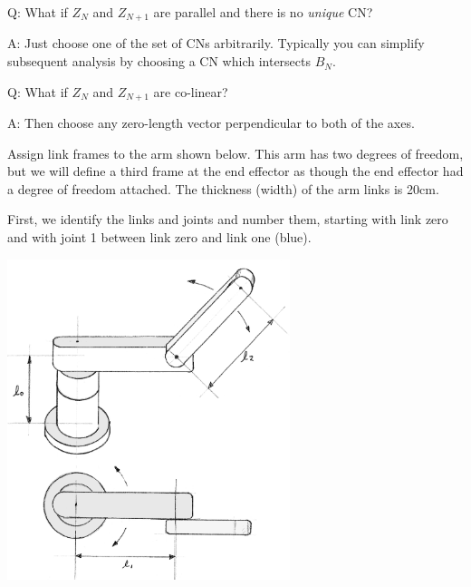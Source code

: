 Q: What if $Z_N$ and $Z_{N+1}$ are parallel and there is no {\it unique} CN?

A: Just choose one of the set of CNs arbitrarily.  Typically you can simplify subsequent analysis by choosing a CN which intersects $B_N$.

Q: What if $Z_N$ and $Z_{N+1}$ are co-linear?

A: Then choose any zero-length vector perpendicular to both of the axes.




%
%
\begin{Example}\label{FKex1}
Assign link frames to the arm shown below.   This arm has two degrees of freedom, but we will define a third frame at the end effector as though the end effector had a degree of freedom attached. The thickness (width) of the arm links is 20cm.


First, we identify the links and joints and number them, starting with link zero and with joint 1 between link zero and link one (blue).
%
%
%

\includegraphics[width=3.25in]{figs03/00715_A.eps}


\end{Example}
